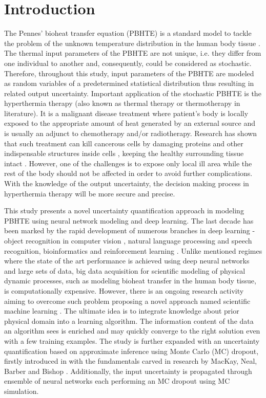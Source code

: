 \documentclass[conference]{IEEEtran}
\begin{document}
\section{Introduction}
\label{sec.introduction}
The Pennes’ bioheat transfer equation (PBHTE) is a standard model to tackle the problem of the unknown temperature distribution in the human body tissue \cite{Huang_pbhte_2015}. The thermal input parameters of the PBHTE are not unique, i.e. they differ from one individual to another and, consequently, could be considered as stochastic. Therefore, throughout this study, input parameters of the PBHTE are modeled as random variables of a predetermined statistical distribution thus resulting in related output uncertainty. Important application of the stochastic PBHTE is the hyperthermia therapy (also known as thermal therapy or thermotherapy in literature). It is a malignant disease treatment where patient's body is locally exposed to the appropriate amount of heat generated by an external source \cite{nci_hyperthermia_2011} and is usually an adjunct to chemotherapy and/or radiotherapy. Research has shown that such treatment can kill cancerous cells by damaging proteins and other indispensable structures inside cells \cite{hildebrandt_hyperthermia_2002}, keeping the healthy surrounding tissue intact \cite{vanderzee_hyperthermia_2002}. However, one of the challenges is to expose only local ill area while the rest of the body should not be affected in order to avoid further complications. With the knowledge of the output uncertainty, the decision making process in hyperthermia therapy will be more secure and precise.

This study presents a novel uncertainty quantification approach in modeling PBHTE using neural network modeling and deep learning. The last decade has been marked by the rapid development of numerous branches in deep learning - object recognition in computer vision \cite{krizhevsky_imagenet_2012}, natural language processing and speech recognition, bioinformatics \cite{lecun_dl_2015} and reinforcement learning \cite{silver_go_2016}. Unlike mentioned regimes where the state of the art performance is achieved using deep neural networks and large sets of data, big data acquisition for scientific modeling of physical dynamic processes, such as modeling bioheat transfer in the human body tissue, is computationally expensive. However, there is an ongoing research activity aiming to overcome such problem proposing a novel approach named scientific machine learning \cite{rackauckas2020universal}. The ultimate idea is to integrate knowledge about prior physical domain into a learning algorithm. The information content of the data an algorithm sees is enriched and may quickly converge to the right solution even with a few training examples. The study is further expanded with an uncertainty quantification based on approximate inference using Monte Carlo (MC) dropout, firstly introduced in \cite{gal2015dropout} with the fundamentals carved in research by MacKay, Neal, Barber and Bishop \cite{mackay_bayesian_1992, neal_thesis_1995, mackay_laplace_1998, barber_ensemble_1998}. Additionally, the input uncertainty is propagated through ensemble of neural networks each performing an MC dropout using MC simulation.
\end{document}
